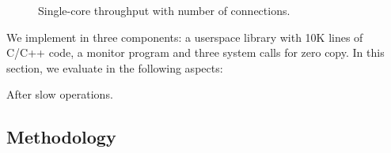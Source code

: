 \begin{figure}[t!]
\begin{minipage}{.31\textwidth}
		\caption{Single-core throughput with number of connections.}
		\label{fig:eval-connnum-tput}
	\end{minipage}
\end{figure}



We implement \sys in three components: a userspace library \libipc{} with 10K lines of C/C++ code, a monitor program and three system calls for zero copy. 
In this section, we evaluate \sys in the following aspects:





After slow operations.



\subsection{Methodology}

